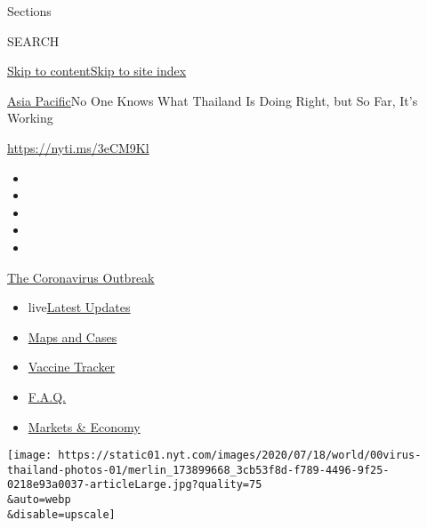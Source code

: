 Sections

SEARCH

\protect\hyperlink{site-content}{Skip to
content}\protect\hyperlink{site-index}{Skip to site index}

\href{/section/world/asia}{Asia Pacific}\textbar{}No One Knows What
Thailand Is Doing Right, but So Far, It's Working

\href{https://nyti.ms/3eCM9Kl}{https://nyti.ms/3eCM9Kl}

\begin{itemize}
\item
\item
\item
\item
\item
\end{itemize}

\href{https://www.nytimes.com/news-event/coronavirus?action=click\&pgtype=Article\&state=default\&region=TOP_BANNER\&context=storylines_menu}{The
Coronavirus Outbreak}

\begin{itemize}
\tightlist
\item
  live\href{https://www.nytimes.com/2020/08/08/world/coronavirus-updates.html?action=click\&pgtype=Article\&state=default\&region=TOP_BANNER\&context=storylines_menu}{Latest
  Updates}
\item
  \href{https://www.nytimes.com/interactive/2020/us/coronavirus-us-cases.html?action=click\&pgtype=Article\&state=default\&region=TOP_BANNER\&context=storylines_menu}{Maps
  and Cases}
\item
  \href{https://www.nytimes.com/interactive/2020/science/coronavirus-vaccine-tracker.html?action=click\&pgtype=Article\&state=default\&region=TOP_BANNER\&context=storylines_menu}{Vaccine
  Tracker}
\item
  \href{https://www.nytimes.com/interactive/2020/world/coronavirus-tips-advice.html?action=click\&pgtype=Article\&state=default\&region=TOP_BANNER\&context=storylines_menu}{F.A.Q.}
\item
  \href{https://www.nytimes.com/live/2020/08/07/business/stock-market-today-coronavirus?action=click\&pgtype=Article\&state=default\&region=TOP_BANNER\&context=storylines_menu}{Markets
  \& Economy}
\end{itemize}

\texttt{[image: https://static01.nyt.com/images/2020/07/18/world/00virus-thailand-photos-01/merlin\_173899668\_3cb53f8d-f789-4496-9f25-0218e93a0037-articleLarge.jpg?quality=75\\\&auto=webp\\\&disable=upscale]}

